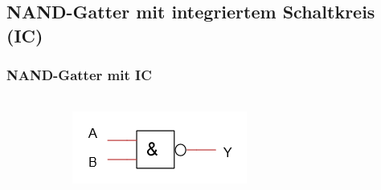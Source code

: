 \subsection{NAND-Gatter mit integriertem Schaltkreis (IC)} %
\label{sub:NAND-Gatter mit integriertem Schaltkreis (IC}
\begin{frame}
    \frametitle{NAND-Gatter mit IC}
    \framesubtitle{}
    \begin{columns}[c]
            \begin{center}
            \end{center}
            \begin{center}
            \end{center}
        \begin{figure}[H]
        \begin{center}
                \includegraphics[scale=0.7]{./img/schaltung/NAND-Gatter.png}
        \end{center}
        \end{figure}
    \end{columns}
\end{frame}

